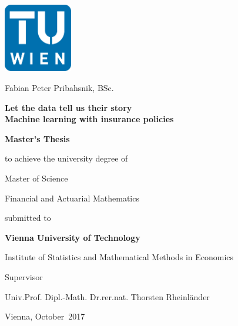 

\begin{titlepage}

{\sffamily

\begin{center}

\includegraphics[width=30mm]{figures/TU_Logo}

\vfill\vfill\vfill
\vfill\vfill\vfill

Fabian Peter Pribahsnik, BSc.

\vfill\vfill\vfill

{\LARGE\bfseries Let the data tell us their story \\ Machine learning with insurance policies}


\vfill\vfill\vfill
\vfill\vfill\vfill


{\bfseries\large Master's Thesis}

to achieve the university degree of

Master of Science

Financial and Actuarial Mathematics


\vfill\vfill\vfill


submitted to

\vfill

{\bfseries\large Vienna University of Technology}

Institute of Statistics and Mathematical Methods in Economics


\vfill\vfill\vfill


Supervisor

Univ.Prof. Dipl.-Math. Dr.rer.nat. Thorsten  Rheinländer

\vfill


\vfill



\vfill\vfill\vfill


Vienna, October~2017

\end{center}
}%
\end{titlepage}

\newpage
